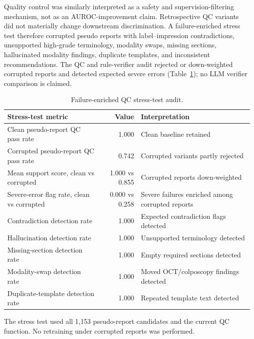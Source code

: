 Quality control was similarly interpreted as a safety and supervision-filtering mechanism, not as an AUROC-improvement claim. Retrospective QC variants did not materially change downstream discrimination. A failure-enriched stress test therefore corrupted pseudo reports with label--impression contradictions, unsupported high-grade terminology, modality swaps, missing sections, hallucinated modality findings, duplicate templates, and inconsistent recommendations. The QC and rule-verifier audit rejected or down-weighted corrupted reports and detected expected severe errors (Table~\ref{tab:qc_failure_stress_test}); no LLM verifier comparison is claimed.

\begin{table}[!htbp]
  \centering
  \caption{Failure-enriched QC stress-test audit.}
  \label{tab:qc_failure_stress_test}
  \small
  \begin{threeparttable}
  \begin{tabular}{lrl}
    \toprule
    \textbf{Stress-test metric} & \textbf{Value} & \textbf{Interpretation} \\
    \midrule
    Clean pseudo-report QC pass rate & 1.000 & Clean baseline retained \\
    Corrupted pseudo-report QC pass rate & 0.742 & Corrupted variants partly rejected \\
    Mean support score, clean vs corrupted & 1.000 vs 0.855 & Corrupted reports down-weighted \\
    Severe-error flag rate, clean vs corrupted & 0.000 vs 0.258 & Severe failures enriched among corrupted reports \\
    Contradiction detection rate & 1.000 & Expected contradiction flags detected \\
    Hallucination detection rate & 1.000 & Unsupported terminology detected \\
    Missing-section detection rate & 1.000 & Empty required sections detected \\
    Modality-swap detection rate & 1.000 & Moved OCT/colposcopy findings detected \\
    Duplicate-template detection rate & 1.000 & Repeated template text detected \\
    \bottomrule
  \end{tabular}
  \begin{tablenotes}[flushleft]
    \footnotesize
    \item The stress test used all 1,153 pseudo-report candidates and the current QC function. No retraining under corrupted reports was performed.
  \end{tablenotes}
  \end{threeparttable}
\end{table}

